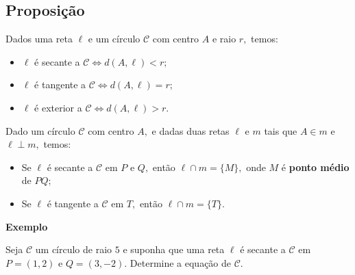 \documentclass[
  brazilian,
  letterpaper,
  DIV=11,
  numbers=noendperiod]{scrreprt}
\providecommand{\tightlist}{%
  \setlength{\itemsep}{0pt}\setlength{\parskip}{0pt}}
\theoremstyle{definition}
\theoremstyle{plain}
\theoremstyle{definition}
\theoremstyle{remark}
\begin{document}
\subsection{Proposição}\label{proposiuxe7uxe3o-16}

Dados uma reta \(\ell\) e um círculo \(\mathcal{C}\) com centro \(A\) e
raio \(r,\) temos:

\begin{itemize}
\tightlist
\item
  \(\ell\) é secante a \(\mathcal{C} \Leftrightarrow  d(A, \ell) < r;\)
\item
  \(\ell\) é tangente a \(\mathcal{C} \Leftrightarrow  d(A, \ell) = r;\)
\item
  \(\ell\) é exterior a \(\mathcal{C} \Leftrightarrow  d(A, \ell) > r.\)
\end{itemize}

Dado um círculo \(\mathcal{C}\) com centro \(A,\) e dadas duas retas
\(\ell\) e \(m\) tais que \(A\in m\) e \(\ell\perp m,\) temos:

\begin{itemize}
\item
  Se \(\ell\) é secante a \(\mathcal{C}\) em \(P\) e \(Q,\) então
  \(\ell\cap m = \{M\},\) onde \(M\) é \textbf{ponto médio} de \(PQ;\)
\item
  Se \(\ell\) é tangente a \(\mathcal{C}\) em \(T,\) então
  \(\ell\cap m = \{T\}.\)
\end{itemize}

\textbf{Exemplo}

Seja \(\mathcal{C}\) um círculo de raio \(5\) e suponha que uma reta
\(\ell\) é secante a \(\mathcal{C}\) em \(P=(1,2)\) e \(Q=(3,-2).\)
Determine a equação de \(\mathcal{C}.\)
\end{document}
